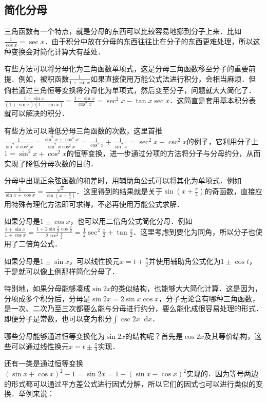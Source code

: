 \documentclass{ctexbook}
\newcommand*{\dif}{\mathop{}\!\mathrm{d}}
\begin{document}
\subsection{简化分母}
三角函数有一个特点，就是分母的东西可以比较容易地挪到分子上来．比如$\frac{1}{\cos{x}}=\sec{x}$．由于积分中放在分母的东西往往比在分子的东西更难处理，所以这种变换会对简化计算大有益处．\par
有些方法可以将分母化为三角函数单项式，这是分母三角函数移至分子的重要前提．例如，被积函数$\frac{1}{1+\sin{x}}$如果直接使用万能公式法进行积分，会相当麻烦．但倘若通过三角恒等变换将分母化为单项式，然后变至分子，问题就大大简化了．$\frac{1-\sin{x}}{\left(1+\sin{x}\right)\left(1-\sin{x}\right)}=\frac{1-\sin{x}}{\cos^{2}{x}}=\sec^{2}{x}-\tan{x}\sec{x}$．这简直是套用基本积分表就可以解决的积分．\par
有些方法可以降低分母三角函数的次数，这里首推$\frac{1}{\sin^{2}{x}\cos^{2}{x}}=\frac{\sin^{2}{x}+\cos^{2}{x}}{\sin^{2}{x}\cos^{2}{x}}=\frac{1}{\cos^{2}{x}}+\frac{1}{\sin^{2}{x}}=\sec^{2}{x}+\csc^{2}{x}$的例子，它利用分子上$1=\sin^{2}{x}+\cos^{2}{x}$的恒等变换，进一步通过分项的方法将分子与分母约分，从而实现了降低分母次数的目的．\par
分母中出现正余弦函数的和差时，用辅助角公式可以将其化为单项式．例如$\frac{1}{\sin{x}+\cos{x}}=\frac{\sqrt{2}}{\sin{\left(x+\frac{\pi}{4}\right)}}$．这里得到的结果就是关于$\sin{\left(x+\frac{\pi}{4}\right)}$的奇函数，直接应用特殊有理化方法即可求得，不必再使用万能公式求解．\par
如果分母是$1\pm\cos{x}$，也可以用二倍角公式简化分母．例如$\frac{1+\sin{x}}{1+\cos{x}}=\frac{1+2\sin{\frac{x}{2}}\cos{\frac{x}{2}}}{2\cos^{2}{\frac{x}{2}}}=\frac{1}{2}\sec^{2}{\frac{x}{2}}+\tan{\frac{x}{2}}$．这里考虑到要化为同角，所以分子也使用了二倍角公式．\par
如果分母是$1\pm\sin{x}$，可以线性换元$x=t+\frac{\pi}{2}$并使用辅助角公式化为$1\pm\cos{t}$，于是就可以像上例那样简化分母了．\par
特别地，如果分母能够凑成$\sin{2x}$的类似结构，也能够大大简化计算．这是因为，分项成多个积分后，分母是$\sin{2x}=2\sin{x}\cos{x}$，分子无论含有哪种三角函数，是一次、二次乃至三次都要么能与分母进行约分，要么能化成很容易处理的形式．即便分子是常数，也可以变为积分$\int\csc{2x}\dif{x}$．\par
哪些分母能够通过恒等变换化为$\sin{2x}$的结构呢？首先是$\cos{2x}$及其等价结构，这些可以通过线性换元$x=t\pm\frac{\pi}{4}$实现．\par
还有一类是通过恒等变换$\left(\sin{x}+\cos{x}\right)^{2}-1=\sin{2x}=1-\left(\sin{x}-\cos{x}\right)^{2}$实现的．因为等号两边的形式都可以通过平方差公式进行因式分解，所以它们的因式也可以进行类似的变换．举例来说：\\
\end{document}
